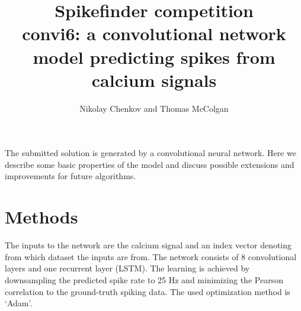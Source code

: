 \documentclass{article}
\begin{document}
\title{Spikefinder competition\\ convi6: a convolutional network model predicting spikes from calcium signals}
\maketitle
\begin{center}
{\author{Nikolay Chenkov and Thomas McColgan}}
\end{center}

The submitted solution is generated by a convolutional neural network. Here 
we describe some basic properties of the model and discuss possible extensions
and improvements for future algorithms.

\section*{Methods}

The inputs to the network are the calcium signal and an index vector denoting
from which dataset the inputs are from. The network consists of 8 convolutional
layers and one recurrent layer (LSTM). The learning is achieved by downsampling 
the predicted spike rate to 25 Hz and minimizing
the Pearson correlation to the ground-truth spiking
data. The used optimization method is `Adam'.
\end{document}
